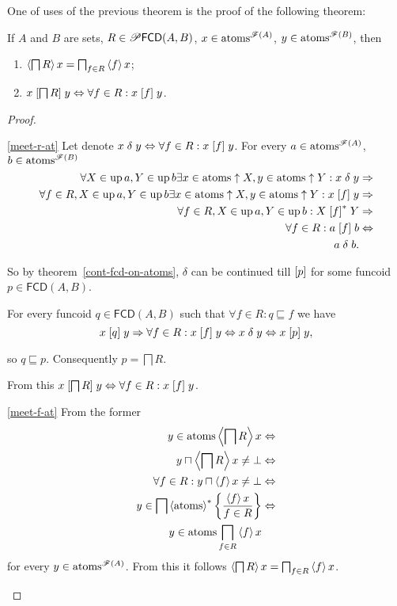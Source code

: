 One of uses of the previous theorem is the proof of the following
theorem:
\begin{thm}
\label{fcd-intrs-atom}If $A$ and $B$ are sets, $R\in\mathscr{P}\mathsf{FCD}(A,B)$,
$x\in\operatorname{atoms}^{\mathscr{F}(A)}$, $y\in\operatorname{atoms}^{\mathscr{F}(B)}$, then
\begin{enumerate}
\item \label{meet-f-at}$\left\langle \bigsqcap R\right\rangle x=\bigsqcap_{f\in R}\left\langle f\right\rangle x$;
\item \label{meet-r-at}$x\mathrel{\left[\bigsqcap R\right]}y\Leftrightarrow\forall f\in
R:x\mathrel{\left[f\right]}y$.
\end{enumerate}
\end{thm}
\begin{proof}
~
\begin{widedisorder}
\item [{\ref{meet-r-at}}] Let denote $x\mathrel\delta y\Leftrightarrow\forall
f\in R:x\mathrel{\left[f\right]}y$.
For every $a\in\operatorname{atoms}^{\mathscr{F}(A)}$, $b\in\operatorname{atoms}^{\mathscr{F}(B)}$
\begin{align*}
\forall X\in\operatorname{up} a,Y\in\operatorname{up} b\exists x\in\operatorname{atoms}\uparrow X,y\in\operatorname{atoms}\uparrow
Y:x\mathrel\delta y & \Rightarrow\\
\forall f\in R,X\in\operatorname{up} a,Y\in\operatorname{up} b\exists x\in\operatorname{atoms}\uparrow X,y\in\operatorname{atoms}\uparrow
Y:x\mathrel{\left[f\right]}y & \Rightarrow\\
\forall f\in R,X\in\operatorname{up} a,Y\in\operatorname{up} b:X\mathrel{\left[f\right]^{\ast}}Y & \Rightarrow\\
\forall f\in R:a\mathrel{\left[f\right]}b & \Leftrightarrow\\
a\mathrel\delta b.
\end{align*}



So by theorem~\ref{cont-fcd-on-atoms}, $\delta$ can be continued
till $\mathrel{\left[p\right]}$ for some funcoid $p\in\mathsf{FCD}(A,B)$.


For every funcoid $q\in\mathsf{FCD}(A,B)$ such that $\forall f\in R:q\sqsubseteq
f$
we have
\[
x\mathrel{\left[q\right]}y\Rightarrow\forall f\in R:x\mathrel{\left[f\right]}y\Leftrightarrow x\mathrel\delta
y\Leftrightarrow x\mathrel{\left[p\right]}y,
\]



so $q\sqsubseteq p$. Consequently $p=\bigsqcap R$.


From this $x\mathrel{\left[\bigsqcap R\right]}y\Leftrightarrow\forall f\in R:x\mathrel{\left[f\right]}y$.

\item [{\ref{meet-f-at}}] From the former
\begin{align*}
y\in\operatorname{atoms}\left\langle \bigsqcap R\right\rangle x & \Leftrightarrow\\
y\sqcap\left\langle \bigsqcap R\right\rangle x\ne\bot & \Leftrightarrow\\
\forall f\in R:y\sqcap\left\langle f\right\rangle x\ne\bot & \Leftrightarrow\\
y\in\bigsqcap\left\langle \operatorname{atoms}\right\rangle ^{\ast}\left\{ \frac{\left\langle f\right\rangle x}{f\in R}\right\} & \Leftrightarrow\\
y\in\operatorname{atoms}\bigsqcap_{f\in R}\left\langle f\right\rangle x
\end{align*}
for every $y\in\operatorname{atoms}^{\mathscr{F}(A)}$. From this it follows $\left\langle \bigsqcap
R\right\rangle x=\bigsqcap_{f\in R}\left\langle f\right\rangle x$.
\end{widedisorder}
\end{proof}
